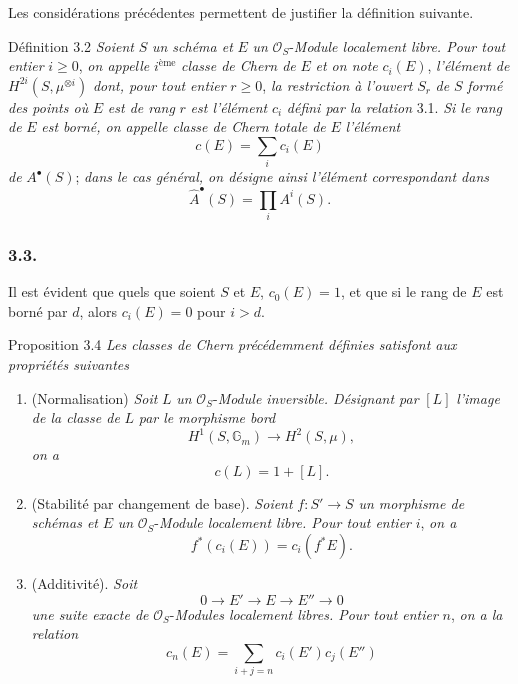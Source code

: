 Les considérations précédentes permettent de justifier la définition suivante.

\begin{statement}{Définition 3.2}
\emph{Soient} $S$ \emph{un schéma et} $E$ \emph{un} $\mathcal{O}_S$-\emph{Module localement libre. Pour tout entier} $i\ge0$, \emph{on appelle} $i^{\text{ème}}$ \emph{classe de Chern de} $E$ \emph{et on note} $c_i(E)$, \emph{l'élément de} $H^{2i}(S,\mu^{\otimes i})$ \emph{dont, pour tout entier} $r\ge0$, \emph{la restriction à l'ouvert} $S_r$ \emph{de} $S$ \emph{formé des points où} $E$ \emph{est de rang} $r$ \emph{est l'élément} $c_i$ \emph{défini par la relation} 3.1. \emph{Si le rang de} $E$ \emph{est borné, on appelle classe de Chern totale de} $E$ \emph{l'élément}
\[
c(E)=\sum_i c_i(E)
\]
\emph{de} $A^\bullet(S)$; \emph{dans le cas général, on désigne ainsi l'élément correspondant dans}
\[
\widehat A^{\bullet}(S)=\prod_i A^i(S).
\]
\end{statement}

\subsubsection*{3.3.}
Il est
évident que quels que soient $S$ et $E$, $c_0(E)=1$, et que si le rang de $E$ est borné par $d$, alors $c_i(E)=0$ pour $i>d$.

\begin{statement}{Proposition 3.4}
\emph{Les classes de Chern précédemment définies satisfont aux propriétés suivantes}
\begin{enumerate}[label=(\roman*)]
\item (Normalisation) \emph{Soit} $L$ \emph{un} $\mathcal{O}_S$-\emph{Module inversible. Désignant par} $[L]$ \emph{l'image de la classe de} $L$ \emph{par le morphisme bord}
\[
H^1(S,\mathbb{G}_m)\longrightarrow H^2(S,\mu),
\]
\emph{on a}
\[
c(L)=1+[L].
\]
\item (Stabilité par changement de base). \emph{Soient} $f:S'\to S$ \emph{un morphisme de schémas et} $E$ \emph{un} $\mathcal{O}_S$-\emph{Module localement libre. Pour tout entier} $i$, \emph{on a}
\[
f^*(c_i(E))=c_i(f^*E).
\]
\item (Additivité). \emph{Soit}
\[
0\to E'\to E\to E''\to0
\]
\emph{une suite exacte de} $\mathcal{O}_S$-\emph{Modules localement libres. Pour tout entier} $n$, \emph{on a la relation}
\[
c_n(E)=\sum_{i+j=n}c_i(E')c_j(E'')
\]
\end{enumerate}
\end{statement}

